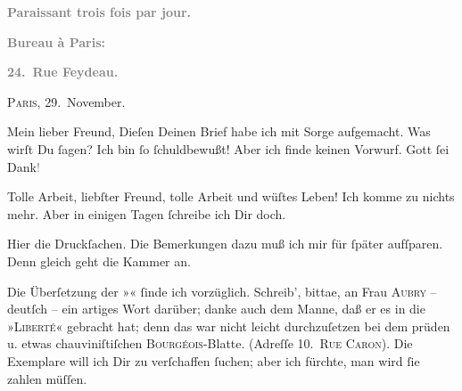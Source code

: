 \pstart
           \begin{otherlanguage}{french}\textcolor{gray}{\textbf{\textbf{Paraissant trois fois par jour.}}}\end{otherlanguage}\pend
           
\pstart
           \begin{otherlanguage}{french}\textcolor{gray}{\textbf{\textbf{Bureau à Paris:}}}\end{otherlanguage}\pend
           
\pstart
           \begin{otherlanguage}{french}\textcolor{gray}{\textbf{\textbf{24. Rue Feydeau.}}}\end{otherlanguage}\hfill \textsc{Paris}, 29. November.\pend
           
\pstart\center{}Mein lieber Freund,\pend\vspace{0.5em}
\pstart
           Dieſen Deinen Brief habe ich mit Sorge aufgemacht. Was wirſt Du ſagen? Ich bin ſo
               ſchuldbewußt! Aber ich finde keinen Vorwurf. Gott ſei Dank\textcolor{gray}{!}\pend
           
\pstart
           Tolle Arbeit, liebſter Freund, tolle Arbeit und wüſtes Leben! Ich komme zu nichts
               mehr. Aber in einigen Tagen ſchreibe ich Dir doch.\pend
           
\pstart
           Hier die Druckſachen. Die Bemerkungen dazu muß ich mir für ſpäter aufſparen. Denn
               gleich geht die Kammer an.\pend
           
\pstart
           {\pb}Die Überſetzung der »\label{K_L02757-1v}\label{K_L02757-1}« ſinde ich vorzüglich. Schreib’, bittae, an Frau \textsc{Aubry} – deutſch – ein artiges Wort darüber; danke auch dem Manne, daß er es in die »\textsc{Liberté}« gebracht hat; denn das war nicht leicht 
               durchzuſetzen bei dem prüden u. etwas chauviniſtiſchen \textsc{Bourgéois}-Blatte. \introOben{}(Adreſſe \textsc{10. Rue Caron}).\introOben{} Die Exemplare
               will ich Dir zu verſchaffen ſuchen; aber ich fürchte, man wird ſie zahlen müſſen.\pend
           
